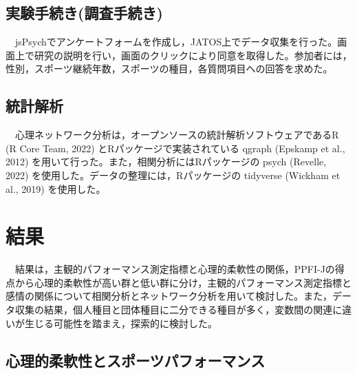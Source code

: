 \documentclass[12pt,a4paper,xelatex,ja=standard]{bxjsarticle}
\begin{document}
\hypertarget{ux5b9fux9a13ux624bux7d9aux304dux8abfux67fbux624bux7d9aux304d}{%
\subsection{実験手続き(調査手続き)}\label{ux5b9fux9a13ux624bux7d9aux304dux8abfux67fbux624bux7d9aux304d}}

　jsPsychでアンケートフォームを作成し，JATOS上でデータ収集を行った。画面上で研究の説明を行い，画面のクリックにより同意を取得した。参加者には，性別，スポーツ継続年数，スポーツの種目，各質問項目への回答を求めた。

\hypertarget{ux7d71ux8a08ux89e3ux6790}{%
\subsection{統計解析}\label{ux7d71ux8a08ux89e3ux6790}}

　心理ネットワーク分析は，オープンソースの統計解析ソフトウェアであるR (R
Core Team, 2022) とRパッケージで実装されている qgraph (Epskamp et al.,
2012) を用いて行った。また，相関分析にはRパッケージの psych (Revelle,
2022) を使用した。データの整理には，Rパッケージの tidyverse (Wickham et
al., 2019) を使用した。

\clearpage

\hypertarget{ux7d50ux679c}{%
\section{結果}\label{ux7d50ux679c}}

　結果は，主観的パフォーマンス測定指標と心理的柔軟性の関係，PPFI-Jの得点から心理的柔軟性が高い群と低い群に分け，主観的パフォーマンス測定指標と感情の関係について相関分析とネットワーク分析を用いて検討した。また，データ収集の結果，個人種目と団体種目に二分できる種目が多く，変数間の関連に違いが生じる可能性を踏まえ，探索的に検討した。

\hypertarget{ux5fc3ux7406ux7684ux67d4ux8edfux6027ux3068ux30b9ux30ddux30fcux30c4ux30d1ux30d5ux30a9ux30fcux30deux30f3ux30b9}{%
\subsection{心理的柔軟性とスポーツパフォーマンス}\label{ux5fc3ux7406ux7684ux67d4ux8edfux6027ux3068ux30b9ux30ddux30fcux30c4ux30d1ux30d5ux30a9ux30fcux30deux30f3ux30b9}}
\end{document}
